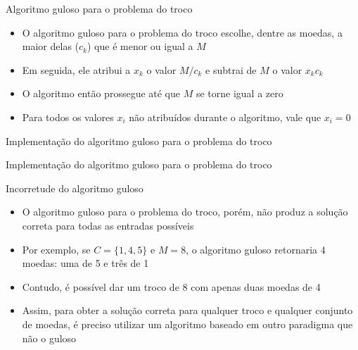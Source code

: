 \begin{frame}[fragile]{Algoritmo guloso para o problema do troco}

    \begin{itemize}
        \item O algoritmo guloso para o problema do troco escolhe, dentre as moedas, a maior delas
            ($c_k$) que é menor ou igual a $M$

        \item Em seguida, ele atribui a $x_k$ o valor $M/c_k$ e subtrai de $M$ o valor $x_kc_k$

        \item O algoritmo então prossegue até que $M$ se torne igual a zero
            
        \item Para todos os valores $x_i$ não atribuídos durante o algoritmo, vale que $x_i = 0$ 

    \end{itemize}

\end{frame}



\begin{frame}[fragile]{Implementação do algoritmo guloso para o problema do troco}
\end{frame}

\begin{frame}[fragile]{Implementação do algoritmo guloso para o problema do troco}
\end{frame}

\begin{frame}[fragile]{Incorretude do algoritmo guloso}

    \begin{itemize}
        \item O algoritmo guloso para o problema do troco, porém, não produz a solução correta para
            todas as entradas possíveis

        \item Por exemplo, se $C = \{ 1, 4, 5 \}$ e $M = 8$, o algoritmo guloso retornaria 4
            moedas: uma de 5 e três de 1

        \item Contudo, é possível dar um troco de 8 com apenas duas moedas de 4

        \item Assim, para obter a solução correta para qualquer troco e qualquer conjunto de 
            moedas, é preciso utilizar um algoritmo baseado em outro paradigma que não o guloso
            
    \end{itemize}

\end{frame}

